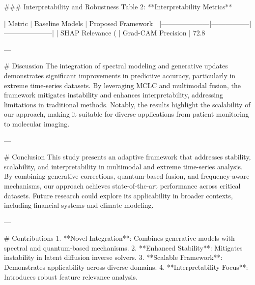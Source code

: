 ### Interpretability and Robustness
Table 2: **Interpretability Metrics**

| Metric              | Baseline Models | Proposed Framework |
|---------------------|-----------------|---------------------|
| SHAP Relevance (%
| Grad-CAM Precision  | 72.8%

---

# Discussion
The integration of spectral modeling and generative updates demonstrates significant improvements in predictive accuracy, particularly in extreme time-series datasets. By leveraging MCLC and multimodal fusion, the framework mitigates instability and enhances interpretability, addressing limitations in traditional methods. Notably, the results highlight the scalability of our approach, making it suitable for diverse applications from patient monitoring to molecular imaging.

---

# Conclusion
This study presents an adaptive framework that addresses stability, scalability, and interpretability in multimodal and extreme time-series analysis. By combining generative corrections, quantum-based fusion, and frequency-aware mechanisms, our approach achieves state-of-the-art performance across critical datasets. Future research could explore its applicability in broader contexts, including financial systems and climate modeling.

---

# Contributions
1. **Novel Integration**: Combines generative models with spectral and quantum-based mechanisms.
2. **Enhanced Stability**: Mitigates instability in latent diffusion inverse solvers.
3. **Scalable Framework**: Demonstrates applicability across diverse domains.
4. **Interpretability Focus**: Introduces robust feature relevance analysis.


